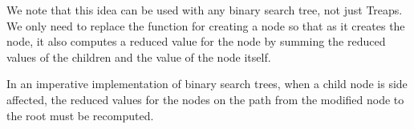We note that this idea can be used with any binary search tree, not
just Treaps.  We only need to replace the function for creating a node
so that as it creates the node, it also computes a reduced value for
the node by summing the reduced values of the children and the value
of the node itself.

\begin{remark}
  In an imperative implementation of binary search trees, when a child
  node is side affected, the reduced values for the nodes on the path
  from the modified node to the root must be recomputed.
\end{remark}







